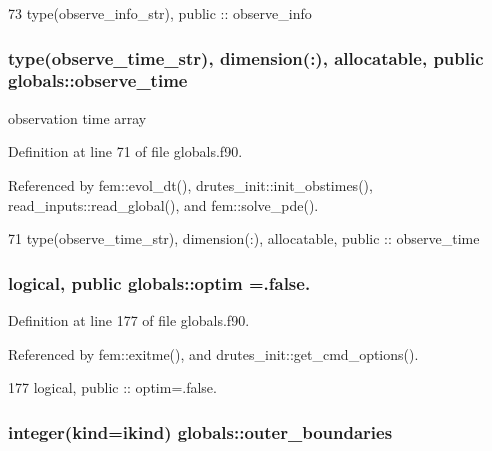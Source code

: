 \begin{DoxyCode}
73   \textcolor{keywordtype}{type}(observe_info_str), \textcolor{keywordtype}{public} :: observe_info
\end{DoxyCode}
\subsubsection[{observe\+\_\+time}]{\setlength{\rightskip}{0pt plus 5cm}type({\bf observe\+\_\+time\+\_\+str}), dimension(\+:), allocatable, public globals\+::observe\+\_\+time}\label{namespaceglobals_a43d9fbed99bd1d36702524d59ca31dbe}


observation time array 



Definition at line 71 of file globals.\+f90.



Referenced by fem\+::evol\+\_\+dt(), drutes\+\_\+init\+::init\+\_\+obstimes(), read\+\_\+inputs\+::read\+\_\+global(), and fem\+::solve\+\_\+pde().


\begin{DoxyCode}
71   \textcolor{keywordtype}{type}(observe_time_str), \textcolor{keywordtype}{dimension(:)}, \textcolor{keywordtype}{allocatable}, \textcolor{keywordtype}{public} :: observe_time
\end{DoxyCode}
\subsubsection[{optim}]{\setlength{\rightskip}{0pt plus 5cm}logical, public globals\+::optim =.false.}\label{namespaceglobals_aa18232935315cb2c3932fc4722697677}


Definition at line 177 of file globals.\+f90.



Referenced by fem\+::exitme(), and drutes\+\_\+init\+::get\+\_\+cmd\+\_\+options().


\begin{DoxyCode}
177   \textcolor{keywordtype}{logical}, \textcolor{keywordtype}{public} :: optim=.false.
\end{DoxyCode}
\subsubsection[{outer\+\_\+boundaries}]{\setlength{\rightskip}{0pt plus 5cm}integer(kind=ikind) globals\+::outer\+\_\+boundaries}\label{namespaceglobals_a322f0275e66840bf00bce456eea53f13}


